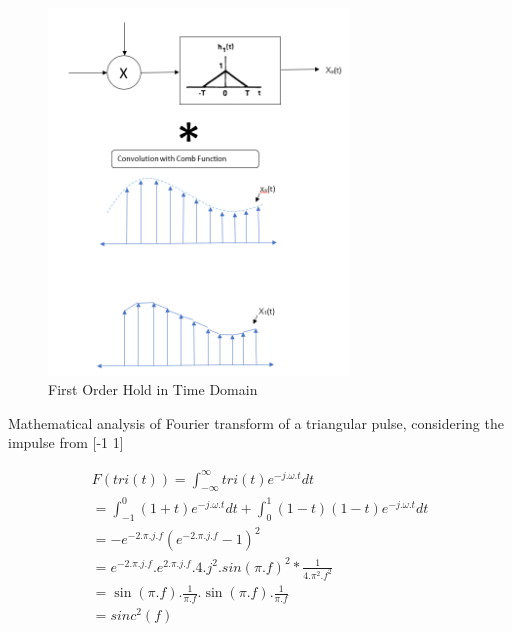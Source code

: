 \documentclass{article}
\begin{document}
\begin{figure}[htbp]
    \begin{center}
	\includegraphics[width=80mm]{figures/FOH.PNG}
    \end{center}
    \caption{First Order Hold in Time Domain}
\end{figure}

Mathematical analysis of Fourier transform of a triangular pulse, considering the impulse from [-1 1]

\begin{equation}
\begin{aligned}
    F(tri(t)) = \int_{-\infty}^{\infty} tri(t) e^{-j.\omega.t} dt \\
    
    = \int_{-1}^{0} (1 + t)e^{-j.\omega.t} dt +  \int_{0}^{1} (1-t) (1-t)e^{-j.\omega.t}dt \\
    
    = -e^{-2.\pi.j.f}(e^{-2.\pi.j.f} -1)^2  \\
    
    = e^{-2.\pi.j.f}.e^{2.\pi.j.f}.4.j^2.sin(\pi.f)^2 * \frac{1}{4.\pi^2.f^2} \\
    
    = \sin(\pi.f) . \frac{1}{\pi.f} . \sin(\pi.f) . \frac{1}{\pi.f} \\
    
    = sinc^2 (f) \\
\end{aligned}
\end{equation}
\end{document}
